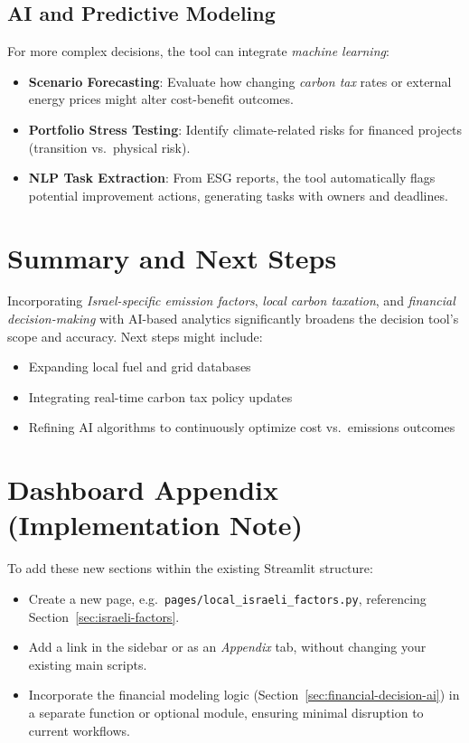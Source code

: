 \documentclass[12pt]{article}
\begin{document}
\subsection{AI and Predictive Modeling}
For more complex decisions, the tool can integrate \emph{machine learning}:
\begin{itemize}
    \item \textbf{Scenario Forecasting}: Evaluate how changing \emph{carbon tax} rates 
    or external energy prices might alter cost-benefit outcomes.
    \item \textbf{Portfolio Stress Testing}: Identify climate-related risks 
    for financed projects (transition vs.\ physical risk).
    \item \textbf{NLP Task Extraction}: From ESG reports, the tool automatically 
    flags potential improvement actions, generating tasks with owners and deadlines.
\end{itemize}

\section{Summary and Next Steps}
Incorporating \emph{Israel-specific emission factors}, \emph{local carbon taxation}, 
and \emph{financial decision-making} with AI-based analytics significantly broadens 
the decision tool's scope and accuracy. Next steps might include:
\begin{itemize}
    \item Expanding local fuel and grid databases
    \item Integrating real-time carbon tax policy updates
    \item Refining AI algorithms to continuously optimize cost vs.\ emissions outcomes
\end{itemize}

\appendix
\section{Dashboard Appendix (Implementation Note)}
To add these new sections within the existing Streamlit structure:
\begin{itemize}
    \item Create a new page, e.g.\ \texttt{pages/local_israeli_factors.py}, 
    referencing Section~\ref{sec:israeli-factors}.
    \item Add a link in the sidebar or as an \emph{Appendix} tab, 
    without changing your existing main scripts.
    \item Incorporate the financial modeling logic (Section~\ref{sec:financial-decision-ai}) 
    in a separate function or optional module, 
    ensuring minimal disruption to current workflows.
\end{itemize}
\end{document}
